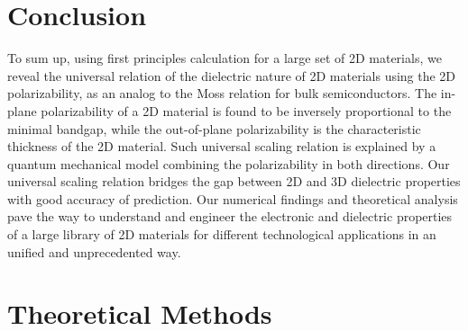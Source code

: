 \documentclass[journal=ancac3,manuscript=article,email=true,hyperref=true,keywords=false]{achemso}
\begin{document}
\section{Conclusion}
\label{sec:org5fd1f1a}

To sum up, using first principles calculation for a large set of 2D
materials, we reveal the universal relation of the dielectric nature
of 2D materials using the 2D polarizability, as an analog to the Moss
relation for bulk semiconductors. The in-plane polarizability of a 2D
material is found to be inversely proportional to the minimal bandgap,
while the out-of-plane polarizability is the characteristic thickness
of the 2D material. Such universal scaling relation is explained by a
quantum mechanical model combining the polarizability in both
directions. Our universal scaling relation bridges the gap between 2D
and 3D dielectric properties with good accuracy of prediction.  Our
numerical findings and theoretical analysis pave the way to understand
and engineer the electronic and dielectric properties of a large
library of 2D materials for different technological applications in an
unified and unprecedented way.

\section{Theoretical Methods}
\label{sec:org8457dbb}
\end{document}
